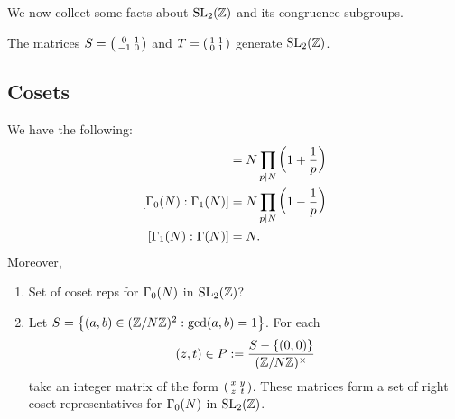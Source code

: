 We now collect some facts about $\operatorname{SL}_2(\mathbb{Z})$ and its congruence subgroups.
\begin{pr}
The matrices $S=\left(\begin{smallmatrix} {0}&{1}\\ {-1}&{0} \end{smallmatrix}\right)$ and $T=\left(\begin{smallmatrix} {1}&{1}\\ {0}&{1} \end{smallmatrix}\right)$ generate $\operatorname{SL}_2(\mathbb{Z})$.
\end{pr}

\subsection{Cosets}
\begin{pr}
We have the following:
\begin{align*}
[\SL_2(\Z):\Ga_0(N)]&=N\prod_{p\mid N}\pa{1+\rc p}\\
[\Ga_0(N):\Ga_1(N)]&=N\prod_{p\mid N}\pa{1-\rc p}\\
[\Ga_1(N):\Ga(N)]&=N.
\end{align*}
Moreover,
\begin{enumerate}
\item
Set of coset reps for $\Gamma_0(N)$ in $\operatorname{SL}_2(\mathbb{Z})$?
\item 
Let $S=\left\{{(a,b)\in (\mathbb{Z}/N\mathbb{Z})^2}:{\gcd(a,b)=1}\right\}$. For each
\[(z,t)\in P:=\frac{S-\{(0,0)\}}{(\mathbb{Z}/N\mathbb{Z})^{\times}}\]
take an integer matrix of the form
$\left(\begin{smallmatrix} {x}&{y}\\ {z}&{t} \end{smallmatrix}\right)$. These matrices
form a set of right coset representatives for ${\Gamma_0(N)}$ in $\operatorname{SL}_2(\mathbb{Z})$. 
\end{enumerate}
\end{pr}
